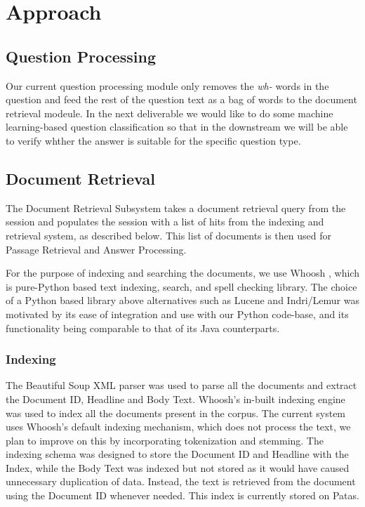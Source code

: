 \documentclass[11pt]{article}
\begin{document}
\section{Approach}
\subsection{Question Processing}
Our current question processing module only removes the {\it wh-} words in the question and feed the rest of the question text as a bag of words to the document retrieval modeule. In the next deliverable we would like to do some machine learning-based question classification so that in the downstream we will be able to verify whther the answer is suitable for the specific question type.

\subsection{Document Retrieval}
The Document Retrieval Subsystem takes a document retrieval query from the session and populates the session with a list of hits from the indexing and retrieval system, as described below. This list of documents is then used for Passage Retrieval and Answer Processing.

For the purpose of indexing and searching the documents, we use Whoosh \cite{whoosh}, which is pure-Python based text indexing, search, and spell checking library. The choice of a Python based library above alternatives such as Lucene and Indri/Lemur was motivated by its ease of integration and use with our Python code-base, and its functionality being comparable to that of its Java counterparts. 

\subsubsection{Indexing}
The Beautiful Soup XML parser \cite{bsoup} was used to parse all the documents and extract the Document ID, Headline and Body Text. Whoosh's in-built indexing engine was used to index all the documents present in the corpus. The current system uses Whoosh's default indexing mechanism, which does not process the text, we plan to improve on this by incorporating tokenization and stemming. The indexing schema was designed to store the Document ID and Headline with the Index, while the Body Text was indexed but not stored as it would have caused unnecessary duplication of data. Instead, the text is retrieved from the document using the Document ID whenever needed. This index is currently stored on Patas.
\end{document}
